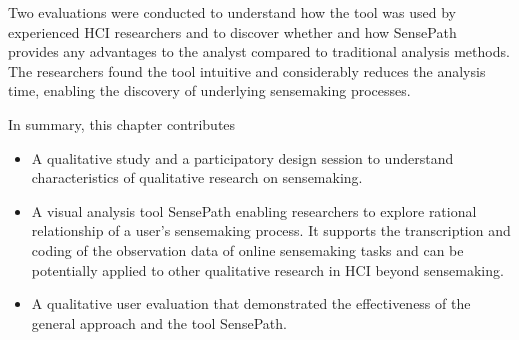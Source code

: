 Two evaluations were conducted to understand how the tool was used by experienced HCI researchers and to discover whether and how SensePath provides any advantages to the analyst compared to traditional analysis methods. The researchers found the tool intuitive and considerably reduces the analysis time, enabling the discovery of underlying sensemaking processes. 

In summary, this chapter contributes
\begin{itemize}
\item A qualitative study and a participatory design session to understand characteristics of qualitative research on sensemaking.
\item A visual analysis tool SensePath enabling researchers to explore rational relationship of a user's sensemaking process. It supports the transcription and coding of the observation data of online sensemaking tasks and can be potentially applied to other qualitative research in HCI beyond sensemaking. 
\item A qualitative user evaluation that demonstrated the effectiveness of the general approach and the tool SensePath.
\end{itemize}